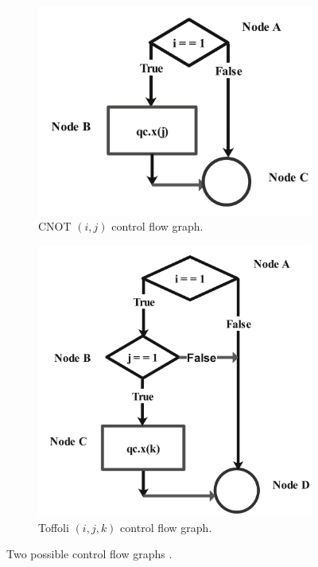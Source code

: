 \begin{itemize}
\begin{figure}[H]
    \centering
    \begin{subfigure}[H]{0.48\textwidth}
        \centering
        \includegraphics[width=\textwidth]{TFM/photos/KumarCNOT.png}
        \caption{CNOT $(i,j)$ control flow graph.} 
        \label{Fig:KumarCNOT}
    \end{subfigure}
    \hfill
    \begin{subfigure}[H]{0.48\textwidth}
        \centering
        \includegraphics[width=\textwidth]{TFM/photos/KumarToffoli.png}
        \caption{Toffoli $(i,j,k)$ control flow graph.} 
        \label{Fig:KumarToffoli}
    \end{subfigure}
        \caption{Two possible control flow graphs \cite{kumar2023formalization}. }
    \label{FIG:KumarCFG}
 \end{figure}


\end{itemize}
